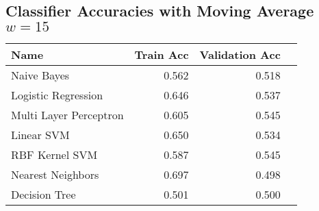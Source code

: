 \documentclass[10pt, oneside]{article}   	%
\begin{document}
\subsection*{Classifier Accuracies with Moving Average $w=15$}
\begin{tabular}{lrrr}
\toprule
   Name &  Train Acc &  Validation Acc\\
\midrule
Naive Bayes &   0.562 &  0.518 \\
Logistic Regression &   0.646 &  0.537 \\
Multi Layer Perceptron &   0.605 &  0.545 \\
Linear SVM &   0.650 &  0.534 \\
RBF Kernel SVM &   0.587 &  0.545 \\
Nearest Neighbors &   0.697 &  0.498 \\
Decision Tree &   0.501 &  0.500 \\
\bottomrule
\end{tabular}
\end{document}
